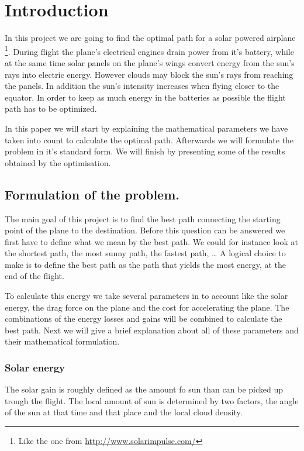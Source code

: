 \section{Introduction}
\setcounter{page}{1}


In this project we are going to find the optimal path for a solar powered airplane \footnote{Like the one from \url{http://www.solarimpulse.com/}}. During flight the plane's electrical engines drain power from it's battery, while at the same time solar panels on the plane's wings convert energy from the sun's rays into electric energy. However clouds may block the sun's rays from reaching the panels. In addition the sun's intensity increases when flying closer to the equator. In order to keep as much energy in the batteries as possible the flight path has to be optimized.

In this paper we will start by explaining the mathematical parameters we have taken into count to calculate the optimal path.
Afterwards we will formulate the problem in it's standard form.
We will finish by presenting some of the results obtained by the optimisation.


\subsection{Formulation of the problem.}

The main goal of this project is to find the best path connecting the starting point of the plane to the destination.
Before this question can be answered we first have to define what we mean by the best path.
We could for instance look at the shortest path, the most sunny path, the fastest path, \dots 
A logical choice to make is to define the best path as the path that yields the most energy, at the end of the flight.

To calculate this energy we  take several parameters in to account like the solar energy, the drag force on the plane and the cost for accelerating the plane.
The combinations of the energy losses and gains will be combined to calculate the best path.
Next we will give a brief explanation about all of these parameters and their mathematical formulation.

\subsubsection{Solar energy}

The solar gain is roughly defined as the amount fo sun than can  be picked up trough the flight.
The local amount of sun is determined by two factors, the angle of the sun at that time and that place and the local cloud density.


